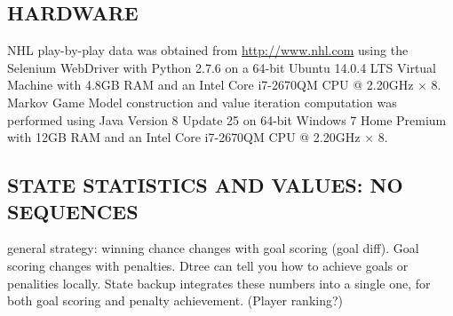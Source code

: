 \documentclass[]{article}
\begin{document}
\subsection{HARDWARE}
 
NHL play-by-play data was obtained from \url{http://www.nhl.com} using the Selenium WebDriver with Python 2.7.6 \citep{Salunke2014} on a 64-bit Ubuntu 14.0.4 LTS Virtual Machine with 4.8GB RAM and an Intel Core i7-2670QM CPU @ 2.20GHz $\times$ 8. Markov Game Model construction and value iteration computation was performed using Java Version 8 Update 25 on 64-bit Windows 7 Home Premium with 12GB RAM and an Intel Core i7-2670QM CPU @ 2.20GHz $\times$ 8.



\subsection{STATE STATISTICS AND VALUES: NO SEQUENCES}

general strategy: winning chance changes with goal scoring (goal diff). Goal scoring changes with penalties.  Dtree can tell you how to achieve goals or penalities locally. State backup integrates these numbers into a single one, for both goal scoring and penalty achievement. (Player ranking?)
\end{document}
